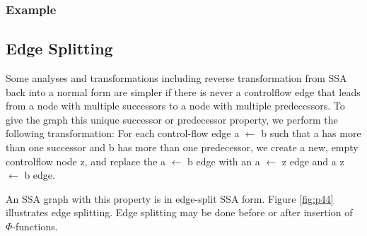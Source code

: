 \subsubsection{Example}






\subsection{Edge Splitting}

Some analyses and transformations including reverse transformation from SSA back into a normal form are simpler if there is never a controlflow edge that leads from a node with multiple successors to a node with multiple predecessors. To give the graph this unique successor or predecessor property, we perform the following transformation: For each control-flow edge a $\gets$ b such that a has more than one successor and b has more than one predecessor, we create a new, empty controlflow node z, and replace the a $\gets$ b edge with an a $\gets$ z edge and a z $\gets$ b edge.

An SSA graph with this property is in edge-split SSA form. Figure \ref{fig:p44} illustrates edge splitting. Edge splitting may be done before or after insertion of $\Phi$-functions.